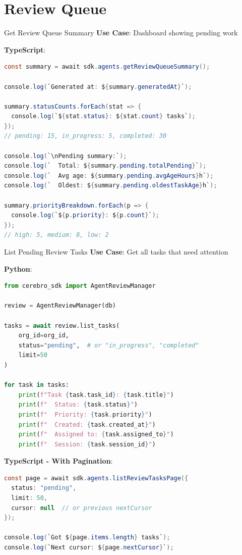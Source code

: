 \documentclass[aspectratio=169]{beamer}
\begin{document}
\section{Review Queue}

\begin{frame}[fragile]{Get Review Queue Summary}
\textbf{Use Case}: Dashboard showing pending work

\textbf{TypeScript}:
\begin{lstlisting}[language=Java]
const summary = await sdk.agents.getReviewQueueSummary();

console.log(`Generated at: ${summary.generatedAt}`);

summary.statusCounts.forEach(stat => {
  console.log(`${stat.status}: ${stat.count} tasks`);
});
// pending: 15, in_progress: 5, completed: 30

console.log(`\nPending summary:`);
console.log(`  Total: ${summary.pending.totalPending}`);
console.log(`  Avg age: ${summary.pending.avgAgeHours}h`);
console.log(`  Oldest: ${summary.pending.oldestTaskAge}h`);

summary.priorityBreakdown.forEach(p => {
  console.log(`${p.priority}: ${p.count}`);
});
// high: 5, medium: 8, low: 2
\end{lstlisting}
\end{frame}

\begin{frame}[fragile]{List Pending Review Tasks}
\textbf{Use Case}: Get all tasks that need attention

\textbf{Python}:
\begin{lstlisting}[language=Python]
from cerebro_sdk import AgentReviewManager

review = AgentReviewManager(db)

tasks = await review.list_tasks(
    org_id=org_id,
    status="pending",  # or "in_progress", "completed"
    limit=50
)

for task in tasks:
    print(f"Task {task.task_id}: {task.title}")
    print(f"  Status: {task.status}")
    print(f"  Priority: {task.priority}")
    print(f"  Created: {task.created_at}")
    print(f"  Assigned to: {task.assigned_to}")
    print(f"  Session: {task.session_id}")
\end{lstlisting}

\textbf{TypeScript - With Pagination}:
\begin{lstlisting}[language=Java]
const page = await sdk.agents.listReviewTasksPage({
  status: "pending",
  limit: 50,
  cursor: null  // or previous nextCursor
});

console.log(`Got ${page.items.length} tasks`);
console.log(`Next cursor: ${page.nextCursor}`);
\end{lstlisting}
\end{frame}
\end{document}
